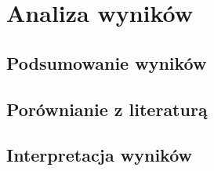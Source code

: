 

\section{Analiza wyników}

\subsection{Podsumowanie wyników}

\subsection{Porównianie z literaturą}

\subsection{Interpretacja wyników}

